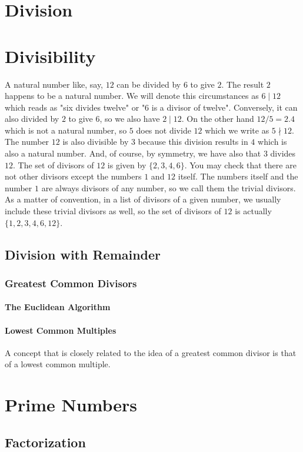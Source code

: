 \section{Division} 

\section{Divisibility}
A natural number like, say, $12$ can be divided by $6$ to give $2$. The result $2$ happens to be a natural number. We will denote this circumstances as $6 \mid 12$ which reads as "six divides twelve" or "6 is a divisor of twelve". Conversely, it can also divided by $2$ to give $6$, so we also have $2 \mid 12$. On the other hand $12 / 5 = 2.4$ which is not a natural number, so $5$ does not divide $12$ which we write as $5 \nmid 12$. The number $12$ is also divisible by $3$ because this division results in $4$ which is also a natural number. And, of course, by symmetry, we have also that $3$ divides $12$. The set of divisors of $12$ is given by $\{2,3,4,6\}$. You may check that there are not other divisors except the numbers $1$ and $12$ itself. The numbers itself and the number $1$ are always divisors of any number, so we call them the trivial divisors. As a matter of convention, in a list of divisors of a given number, we usually include these trivial divisors as well, so the set of divisors of $12$ is actually $\{1,2,3,4,6,12\}$.


\subsection{Division with Remainder}

\subsubsection{Greatest Common Divisors}
\paragraph{The Euclidean Algorithm}
\paragraph{Lowest Common Multiples}
A concept that is closely related to the idea of a greatest common divisor is that of a lowest common multiple.

\section{Prime Numbers}

\subsection{Factorization}